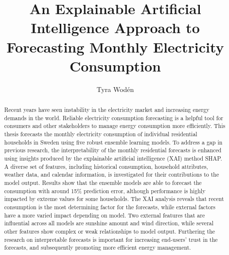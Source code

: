 \documentclass[a4paper,11pt]{report} %
\title{An Explainable Artificial Intelligence Approach to Forecasting Monthly Electricity Consumption}
\author{Tyra Wodén}
\begin{document}
\maketitle

\cleardoublepage


\begin{abstract}


     Recent years have seen instability in the electricity market and increasing energy demands in the world. Reliable electricity consumption forecasting is a helpful tool for consumers and other stakeholders to manage energy consumption more efficiently. This thesis forecasts the monthly electricity consumption of individual residential households in Sweden using five robust ensemble learning models. To address a gap in previous research, the interpretability of the monthly residential forecasts is enhanced using insights produced by the explainable artificial intelligence (XAI) method SHAP. A diverse set of features, including historical consumption, household attributes, weather data, and calendar information, is investigated for their contributions to the model output. Results show that the ensemble models are able to forecast the consumption with around 15\% prediction error, although performance is highly impacted by extreme values for some households. The XAI analysis reveals that recent consumption is the most determining factor for the forecasts, %
	 while external factors have a more varied impact depending on model. Two external features that are influential across all models are sunshine amount and wind direction, while several other features show complex or weak relationships to model output. %
	 Furthering the research on interpretable forecasts is important for increasing end-users' trust in the forecasts, and subsequently promoting more efficient energy management.


\end{abstract}
\end{document}
